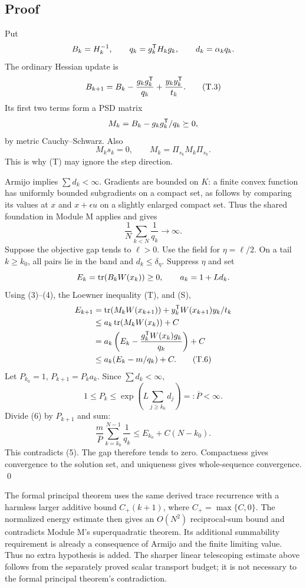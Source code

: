 \subsection{Proof}
Put
\[
 B_k=H_k^{-1},\qquad q_k=g_k^{\mathsf T} H_kg_k,\qquad
 d_k=\alpha_kq_k.
\]
The ordinary Hessian update is
\begin{equation}
 B_{k+1}=B_k-\frac{g_kg_k^{\mathsf T}}{q_k}+\frac{y_ky_k^{\mathsf T}}{t_k}. \tag{T.3}
\end{equation}
Its first two terms form a PSD matrix
\[
 M_k=B_k-g_kg_k^{\mathsf T}/q_k\succeq0,
\]
by metric Cauchy--Schwarz. Also
\begin{equation}
 M_ks_k=0,\qquad M_k=\Pi_{s_k}M_k\Pi_{s_k}. \tag{T.4}
\end{equation}
This is why (T) may ignore the step direction.

Armijo implies $\sum d_k<\infty$. Gradients are bounded on $K$: a finite convex function has uniformly bounded subgradients on a compact set, as follows by comparing its values at $x$ and $x+\epsilon u$ on a slightly enlarged compact set. Thus the shared foundation in Module M applies and gives
\begin{equation}
 \frac1N\sum_{k<N}\frac1{q_k}\longrightarrow\infty. \tag{T.5}
\end{equation}
Suppose the objective gap tends to $\ell>0$. Use the field for $\eta=\ell/2$. On a tail $k\ge k_0$, all pairs lie in the band and $d_k\le\delta_\eta$. Suppress $\eta$ and set
\[
 E_k=\operatorname{tr}(B_kW(x_k))\ge0,\qquad a_k=1+L d_k.
\]
Using (3)--(4), the Loewner inequality (T), and (S),
\begin{align}
 E_{k+1}
 &=\operatorname{tr}(M_kW(x_{k+1}))+y_k^{\mathsf T} W(x_{k+1})y_k/t_k\notag\\
 &\le a_k\operatorname{tr}(M_kW(x_k))+C\notag\\
 &=a_k\left(E_k-\frac{g_k^{\mathsf T} W(x_k)g_k}{q_k}\right)+C\notag\\
 &\le a_k(E_k-m/q_k)+C. \tag{T.6}
\end{align}
Let $P_{k_0}=1$, $P_{k+1}=P_ka_k$. Since $\sum d_k<\infty$,
\[
 1\le P_k\le \exp\left(L\sum_{j\ge k_0}d_j\right)=:\overline P<\infty.
\]
Divide (6) by $P_{k+1}$ and sum:
\[
 \frac m{\overline P}\sum_{k=k_0}^{N-1}\frac1{q_k}
 \le E_{k_0}+C(N-k_0).
\]
This contradicts (5). The gap therefore tends to zero. Compactness gives convergence to the solution set, and uniqueness gives whole-sequence convergence. \qed

The formal principal theorem uses the same derived trace recurrence with a harmless larger additive bound $C_+(k+1)$, where $C_+=\max\{C,0\}$. The normalized energy estimate then gives an $O(N^2)$ reciprocal-sum bound and contradicts Module M's superquadratic theorem. Its additional summability requirement is already a consequence of Armijo and the finite limiting value. Thus no extra hypothesis is added. The sharper linear telescoping estimate above follows from the separately proved scalar transport budget; it is not necessary to the formal principal theorem's contradiction.

